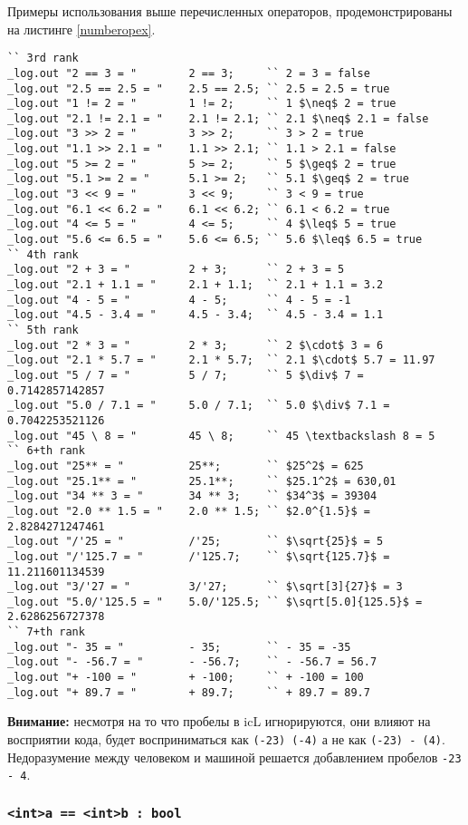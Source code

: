 \documentclass[a4paper, 14pt]{extarticle}
\begin{document}
Примеры использования выше перечисленных операторов, продемонстрированы на листинге \ref{numberopex}.

\begin{lstlisting}[caption=Примеры использования операторов над данными типа int и double, label=numberopex]
`` 3rd rank
_log.out "2 == 3 = "		2 == 3;		`` 2 = 3 = false
_log.out "2.5 == 2.5 = "	2.5 == 2.5;	`` 2.5 = 2.5 = true
_log.out "1 != 2 = "		1 != 2;		`` 1 $\neq$ 2 = true
_log.out "2.1 != 2.1 = "	2.1 != 2.1;	`` 2.1 $\neq$ 2.1 = false
_log.out "3 >> 2 = "		3 >> 2;		`` 3 > 2 = true
_log.out "1.1 >> 2.1 = "	1.1 >> 2.1;	`` 1.1 > 2.1 = false
_log.out "5 >= 2 = "		5 >= 2;		`` 5 $\geq$ 2 = true
_log.out "5.1 >= 2 = "		5.1 >= 2;	`` 5.1 $\geq$ 2 = true
_log.out "3 << 9 = "		3 << 9;		`` 3 < 9 = true
_log.out "6.1 << 6.2 = "	6.1 << 6.2;	`` 6.1 < 6.2 = true
_log.out "4 <= 5 = "		4 <= 5;		`` 4 $\leq$ 5 = true
_log.out "5.6 <= 6.5 = "	5.6 <= 6.5;	`` 5.6 $\leq$ 6.5 = true
`` 4th rank
_log.out "2 + 3 = "			2 + 3;		`` 2 + 3 = 5
_log.out "2.1 + 1.1 = "		2.1 + 1.1;	`` 2.1 + 1.1 = 3.2
_log.out "4 - 5 = "			4 - 5;		`` 4 - 5 = -1
_log.out "4.5 - 3.4 = "		4.5 - 3.4;	`` 4.5 - 3.4 = 1.1
`` 5th rank
_log.out "2 * 3 = "			2 * 3;		`` 2 $\cdot$ 3 = 6
_log.out "2.1 * 5.7 = "		2.1 * 5.7;	`` 2.1 $\cdot$ 5.7 = 11.97
_log.out "5 / 7 = "			5 / 7;		`` 5 $\div$ 7 = 0.7142857142857
_log.out "5.0 / 7.1 = "		5.0 / 7.1;	`` 5.0 $\div$ 7.1 = 0.7042253521126
_log.out "45 \ 8 = "		45 \ 8;		`` 45 \textbackslash 8 = 5
`` 6+th rank
_log.out "25** = "			25**;		`` $25^2$ = 625
_log.out "25.1** = "		25.1**;		`` $25.1^2$ = 630,01
_log.out "34 ** 3 = "		34 ** 3;	`` $34^3$ = 39304
_log.out "2.0 ** 1.5 = "	2.0 ** 1.5;	`` $2.0^{1.5}$ = 2.8284271247461
_log.out "/'25 = "			/'25;		`` $\sqrt{25}$ = 5
_log.out "/'125.7 = "		/'125.7;	`` $\sqrt{125.7}$ = 11.211601134539
_log.out "3/'27 = "			3/'27;		`` $\sqrt[3]{27}$ = 3
_log.out "5.0/'125.5 = "	5.0/'125.5;	`` $\sqrt[5.0]{125.5}$ = 2.6286256727378
`` 7+th rank
_log.out "- 35 = "			- 35;		`` - 35 = -35
_log.out "- -56.7 = "		- -56.7;	`` - -56.7 = 56.7
_log.out "+ -100 = "		+ -100;		`` + -100 = 100
_log.out "+ 89.7 = "		+ 89.7;		`` + 89.7 = 89.7
\end{lstlisting}

{\bf Внимание:} несмотря на то что пробелы в icL игнорируются, они влияют на восприятии кода,  будет восприниматься как \lstinline`(-23) (-4)` а не как \lstinline`(-23) - (4)`. Недоразумение между человеком и машиной решается добавлением пробелов \lstinline`-23  - 4`.

\subsubsection{\lstinline`<int>a == <int>b : bool`}
\end{document}
